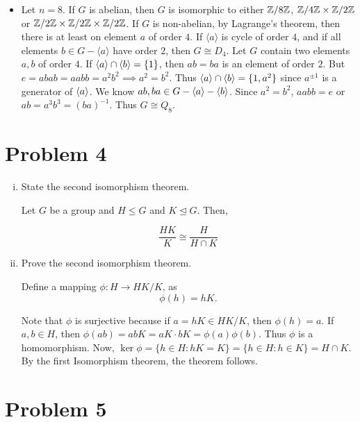 \documentclass[12pt]{article}
\begin{document}
\begin{itemize}
        
         \item Let $n = 8$. If $G$ is abelian, then $ G $ is isomorphic to either $\mathbb{Z}/{8}\mathbb{Z}$, $\mathbb{Z}/{4}\mathbb{Z} \times \mathbb{Z}/{2}\mathbb{Z}$ or $\mathbb{Z}/{2}\mathbb{Z} \times \mathbb{Z}/{2}\mathbb{Z} \times \mathbb{Z}/{2}\mathbb{Z}$. If $G$ is non-abelian, by Lagrange's theorem, then there is at least on element $a$ of order $4$. If $\langle a \rangle$ is cycle of order $4$, and if all elements $b \in G - \langle a \rangle$ have order $2$, then $G \cong D_4$. Let $G$ contain two elements $a, b$ of order $4$. If $\langle a \rangle \cap \langle b \rangle = \{1\}$, then $ab = ba $ is an element of order $2$. But $e = abab = aabb = a^2b^2 \implies a^2 = b^2$. Thus $\langle a \rangle \cap \langle b \rangle = \{1, a^2\}$ since $a^{\pm 1}$ is a generator of $\langle a \rangle$. We know $ab, ba \in G - \langle a \rangle - \langle b \rangle$. Since $a^2 = b^2$, $aabb = e$ or $ab = a^3b^3 = (ba)^{-1}$. Thus $G\cong Q_8$. 
    \end{itemize}

\section*{Problem 4}
\begin{enumerate}[(i)]
    \item State the second isomorphism theorem.

    Let $G$ be a group and $H \leq G$ and $K \unlhd G$. Then, 

    $$\dfrac{HK}{K} \cong \dfrac{H}{H \cap K}$$

    \item Prove the second isomorphism theorem.

    Define a mapping $\phi: H \to HK/K$, as 
    $$\phi(h) = hK.$$

    Note that $\phi$ is surjective because if $a = hK \in HK/K$, then $\phi(h) = a.$ If $a, b \in H$, then $\phi(ab) = abK = aK\cdot bK = \phi(a)\phi(b)$. Thus $\phi$ is a homomorphism. Now, 
    $\ker \phi = \{h \in H: hK = K\} = \{h \in H: h \in K\} = H \cap K$. By the first Isomorphism theorem, the theorem follows.
    \end{enumerate}

    \section*{Problem 5}
\end{document}
